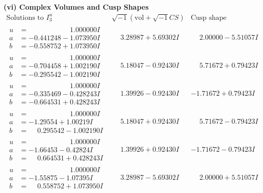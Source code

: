 \documentclass[1p]{elsarticle_modified}
\theoremstyle{definition}
\newcommand{\I}{\sqrt{-1}}
\begin{document}
\newpage\flushleft \textbf{(vi) Complex Volumes and Cusp Shapes}
$$\begin{array}{c|c|c}  
\text{Solutions to }I^u_{3}& \I (\text{vol} + \sqrt{-1}CS) & \text{Cusp shape}\\
 \hline 
\begin{aligned}
u &= \phantom{-0.000000 -}1.000000 I \\
a &= -0.441248 - 1.073950 I \\
b &= -0.558752 + 1.073950 I\end{aligned}
 & \phantom{-}3.28987 + 5.69302 I & \phantom{-}2.00000 - 5.51057 I \\ \hline\begin{aligned}
u &= \phantom{-0.000000 -}1.000000 I \\
a &= -0.704458 + 1.002190 I \\
b &= -0.295542 - 1.002190 I\end{aligned}
 & \phantom{-}5.18047 - 0.92430 I & \phantom{-}5.71672 + 0.79423 I \\ \hline\begin{aligned}
u &= \phantom{-0.000000 -}1.000000 I \\
a &= -0.335469 - 0.428243 I \\
b &= -0.664531 + 0.428243 I\end{aligned}
 & \phantom{-}1.39926 - 0.92430 I & -1.71672 + 0.79423 I \\ \hline\begin{aligned}
u &= \phantom{-0.000000 -}1.000000 I \\
a &= -1.29554 + 1.00219 I \\
b &= \phantom{-}0.295542 - 1.002190 I\end{aligned}
 & \phantom{-}5.18047 + 0.92430 I & \phantom{-}5.71672 - 0.79423 I \\ \hline\begin{aligned}
u &= \phantom{-0.000000 -}1.000000 I \\
a &= -1.66453 - 0.42824 I \\
b &= \phantom{-}0.664531 + 0.428243 I\end{aligned}
 & \phantom{-}1.39926 + 0.92430 I & -1.71672 - 0.79423 I \\ \hline\begin{aligned}
u &= \phantom{-0.000000 -}1.000000 I \\
a &= -1.55875 - 1.07395 I \\
b &= \phantom{-}0.558752 + 1.073950 I\end{aligned}
 & \phantom{-}3.28987 - 5.69302 I & \phantom{-}2.00000 + 5.51057 I \\ \hline\begin{aligned}

\end{aligned}
\end{array}$$
\end{document}
